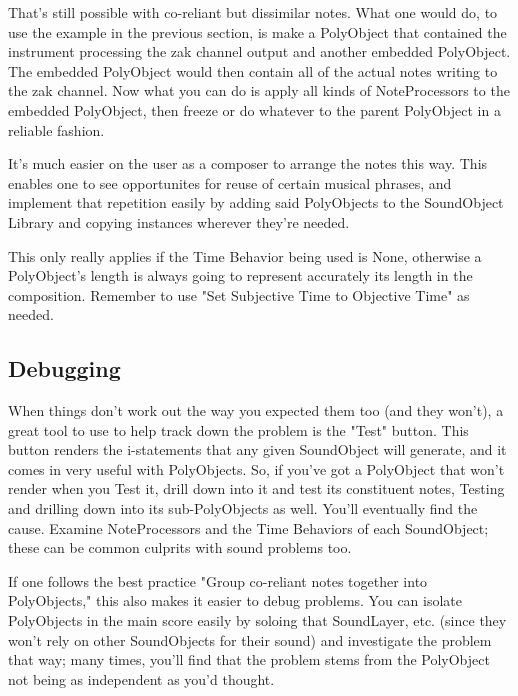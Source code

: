 That's still possible with co-reliant but dissimilar notes. What one
would do, to use the example in the previous section, is make a
PolyObject that contained the instrument processing the zak channel
output and another embedded PolyObject. The embedded PolyObject would
then contain all of the actual notes writing to the zak channel. Now
what you can do is apply all kinds of NoteProcessors to the embedded
PolyObject, then freeze or do whatever to the parent PolyObject in a
reliable fashion.

It's much easier on the user as a composer to arrange the notes this
way. This enables one to see opportunites for reuse of certain musical
phrases, and implement that repetition easily by adding said PolyObjects
to the SoundObject Library and copying instances wherever they're
needed.

This only really applies if the Time Behavior being used is None,
otherwise a PolyObject's length is always going to represent accurately
its length in the composition. Remember to use "Set Subjective Time to
Objective Time" as needed.

\subsection{Debugging}

When things don't work out the way you expected them too (and they
won't), a great tool to use to help track down the problem is the "Test"
button. This button renders the i-statements that any given SoundObject
will generate, and it comes in very useful with PolyObjects. So, if
you've got a PolyObject that won't render when you Test it, drill down
into it and test its constituent notes, Testing and drilling down into
its sub-PolyObjects as well. You'll eventually find the cause. Examine
NoteProcessors and the Time Behaviors of each SoundObject; these can be
common culprits with sound problems too.

If one follows the best practice "Group co-reliant notes together into
PolyObjects," this also makes it easier to debug problems. You can
isolate PolyObjects in the main score easily by soloing that SoundLayer,
etc. (since they won't rely on other SoundObjects for their sound) and
investigate the problem that way; many times, you'll find that the
problem stems from the PolyObject not being as independent as you'd
thought.

